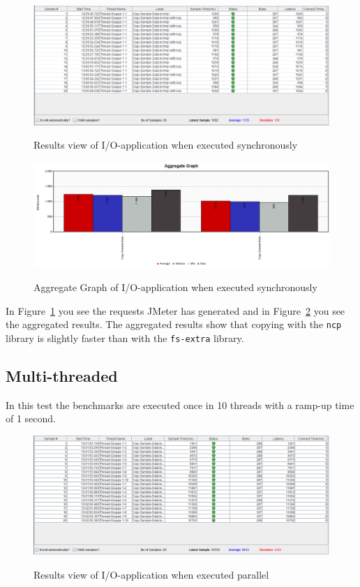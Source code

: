 \begin{figure}[!h]
  \caption{Results view of I/O-application when executed synchronously}
  \centering
    \includegraphics[width=1\textwidth]{Screenshots/io-results-looped}
    \label{fig:io-results-looped}
\end{figure}

\begin{figure}[!h]
  \caption{Aggregate Graph of I/O-application when executed synchronously}
  \centering
    \includegraphics[width=1\textwidth]{Screenshots/io-graph-looped}
    \label{fig:io-graph-looped}
\end{figure}

In Figure~\ref{fig:io-results-looped} you see the requests JMeter has generated and in Figure~\ref{fig:io-graph-looped} you see the aggregated results. The aggregated results show that copying with the \texttt{ncp} library is slightly faster than with the \texttt{fs-extra} library.


\subsection{Multi-threaded}
\label{subsec:io-results-threaded}
In this test the benchmarks are executed once in 10 threads with a ramp-up time of 1 second. 

\begin{figure}[!h]
  \caption{Results view of I/O-application when executed parallel}
  \centering
    \includegraphics[width=1\textwidth]{Screenshots/io-results-threaded}
    \label{fig:io-results-threaded}
\end{figure}

